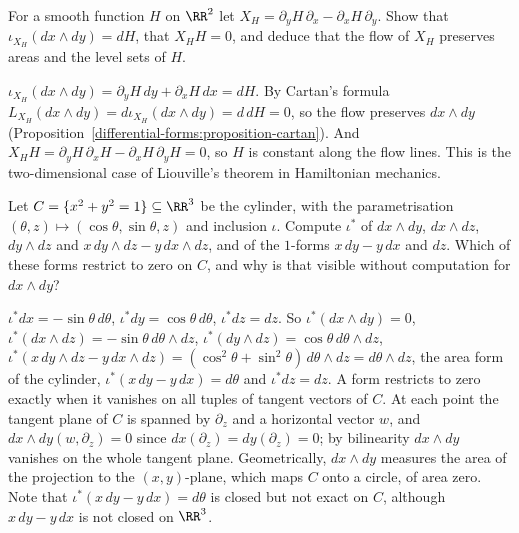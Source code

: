 \begin{exercise}\label{differential-forms:exercise-hamiltonian-area}
For a smooth function $H$ on $\RR^2$ let $X_H = \partial_yH\,\partial_x - \partial_xH\,\partial_y$. Show that $\iota_{X_H}(dx \wedge dy) = dH$, that $X_HH = 0$, and deduce that the flow of $X_H$
preserves areas and the level sets of $H$.
\end{exercise}

\begin{solution}
$\iota_{X_H}(dx \wedge dy) = \partial_yH\,dy + \partial_xH\,dx = dH$. By Cartan's formula $L_{X_H}(dx \wedge dy) = d\iota_{X_H}(dx \wedge dy) = d\,dH = 0$, so the flow preserves $dx \wedge dy$
(Proposition~\ref{differential-forms:proposition-cartan}). And $X_HH = \partial_yH\,\partial_xH - \partial_xH\,\partial_yH = 0$, so $H$ is constant along the flow lines. This is the
two-dimensional case of Liouville's theorem in Hamiltonian mechanics.
\end{solution}

\begin{exercise}\label{differential-forms:exercise-forms-on-submanifolds}
Let $C = \{x^2 + y^2 = 1\} \subseteq \RR^3$ be the cylinder, with the parametrisation $(\theta, z) \mapsto (\cos\theta, \sin\theta, z)$ and inclusion $\iota$. Compute $\iota^*$ of $dx \wedge dy$, $dx \wedge dz$,
$dy \wedge dz$ and $x\,dy \wedge dz - y\,dx \wedge dz$, and of the $1$-forms $x\,dy - y\,dx$ and $dz$. Which of these forms restrict to zero on $C$, and why is that visible without computation for
$dx \wedge dy$?
\end{exercise}

\begin{solution}
$\iota^*dx = -\sin\theta\,d\theta$, $\iota^*dy = \cos\theta\,d\theta$, $\iota^*dz = dz$. So $\iota^*(dx \wedge dy) = 0$, $\iota^*(dx \wedge dz) = -\sin\theta\,d\theta \wedge dz$,
$\iota^*(dy \wedge dz) = \cos\theta\,d\theta \wedge dz$, $\iota^*(x\,dy \wedge dz - y\,dx \wedge dz) = (\cos^2\theta + \sin^2\theta)\,d\theta \wedge dz = d\theta \wedge dz$, the area form of the cylinder,
$\iota^*(x\,dy - y\,dx) = d\theta$ and $\iota^*dz = dz$. A form restricts to zero exactly when it vanishes on all tuples of tangent vectors of $C$. At each point the tangent plane of $C$ is spanned by $\partial_z$ and a
horizontal vector $w$, and $dx \wedge dy(w, \partial_z) = 0$ since $dx(\partial_z) = dy(\partial_z) = 0$; by bilinearity $dx \wedge dy$ vanishes on the whole tangent plane. Geometrically, $dx \wedge dy$ measures
the area of the projection to the $(x, y)$-plane, which maps $C$ onto a circle, of area zero. Note that $\iota^*(x\,dy - y\,dx) = d\theta$ is closed but not exact on $C$, although
$x\,dy - y\,dx$ is not closed on $\RR^3$.
\end{solution}

